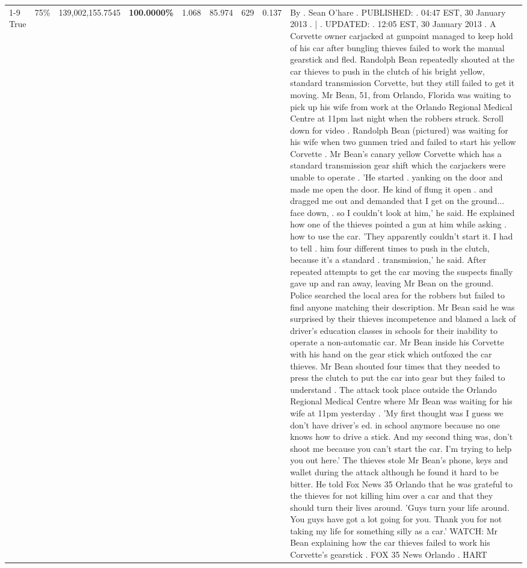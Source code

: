 \begin{table}[H]
\begin{tabular}{lllrlllll}
\cline{1-9} \cline{2-9}
True & 75\% & 139,002,155.7545 & \bfseries \color{red} 100.0000\% & 1.068 & 85.974 & 629 & 0.137 & By . Sean O'hare . PUBLISHED: . 04:47 EST, 30 January 2013 . | . UPDATED: . 12:05 EST, 30 January 2013 . A Corvette owner carjacked at gunpoint managed to keep hold of his car after bungling thieves failed to work the manual gearstick and fled. Randolph Bean repeatedly shouted at the car thieves to push in the clutch of his bright yellow, standard transmission Corvette, but they still failed to get it moving. Mr Bean, 51, from Orlando, Florida was waiting to pick up his wife from work at the Orlando Regional Medical Centre at 11pm last night when the robbers struck. Scroll down for video . Randolph Bean (pictured) was waiting for his wife when two gunmen tried and failed to start his yellow Corvette . Mr Bean's canary yellow Corvette which has a standard transmission gear shift which the carjackers were unable to operate . 'He started . yanking on the door and made me open the door. He kind of flung it open . and dragged me out and demanded that I get on the ground... face down, . so I couldn't look at him,' he said. He explained how one of the thieves pointed a gun at him while asking . how to use the car. 'They apparently couldn't start it. I had to tell . him four different times to push in the clutch, because it's a standard . transmission,' he said. After repeated attempts to get the car moving the suspects finally gave up and ran away, leaving Mr Bean on the ground. Police searched the local area for the robbers but failed to find anyone matching their description. Mr Bean said he was surprised by their thieves incompetence and blamed a lack of driver's education classes in schools for their inability to operate a non-automatic car. Mr Bean inside his Corvette with his hand on the gear stick which outfoxed the car thieves. Mr Bean shouted four times that they needed to press the clutch to put the car into gear but they failed to understand . The attack took place outside the Orlando Regional Medical Centre where Mr Bean was waiting for his wife at 11pm yesterday . 'My first thought was I guess we don't have driver's ed. in school anymore because no one knows how to drive a stick. And my second thing was, don't shoot me because you can't start the car. I'm trying to help you out here.' The thieves stole Mr Bean's phone, keys and wallet during the attack although he found it hard to be bitter. He told Fox News 35 Orlando that he was grateful to the thieves for not killing him over a car and that they should turn their lives around. 'Guys turn your life around. You guys have got a lot going for you. Thank you for not taking my life for something silly as a car.' WATCH: Mr Bean explaining how the car thieves failed to work his Corvette's gearstick . FOX 35 News Orlando . HART \\

\end{tabular}
\end{table}
